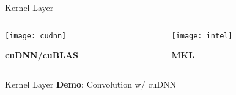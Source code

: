 
\begin{slide}{Kernel Layer}
  \begin{columns}
    \begin{column}{0.5\textwidth}
      \centering
      \texttt{[image: cudnn]}

      \vspace{0.3cm}
      \textbf{cuDNN/cuBLAS}
    \end{column}
    \begin{column}{0.5\textwidth}
      \centering
      \texttt{[image: intel]}

      \vspace{0.3cm}
      \textbf{MKL}
    \end{column}
  \end{columns}
\end{slide}

\begin{slide}{Kernel Layer}
  \huge
  \textbf{Demo}: Convolution w/ cuDNN
\end{slide}
